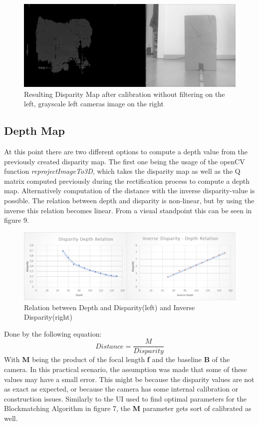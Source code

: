 \documentclass[journal,onecolumn]{IEEEtran}
\begin{document}
\begin{figure}[H]
	\centering
	\includegraphics[scale=0.5]{disparityMap.png}
	\captionsetup{justification=centering}
	\caption{Resulting Disparity Map after calibration without filtering on the left, grayscale left cameras image on the right}
\end{figure}

\subsection{Depth Map}
\noindent
\noindent At this point there are two different options to compute a depth value from the previously created disparity map. The first one being the usage of the openCV function \emph{reprojectImageTo3D}, which takes the disparity map as well as the Q matrix computed  previously during the rectification process to compute a depth map.
Alternatively computation of the distance with the inverse disparity-value is possible. The relation between depth and disparity is non-linear, but by using the inverse this relation becomes linear. From a visual standpoint this can be seen in figure 9.
\begin{figure}[H]
	\centering
	\includegraphics[scale=0.5]{ratios.png}
	\captionsetup{justification=centering}
	\caption{Relation between Depth and Disparity(left) and Inverse Disparity(right)}
\end{figure}
\noindent Done by the following equation:
\begin{equation}
	Distance = \frac{M}{Disparity}
\end{equation}
\noindent With {\bf M} being the product of the focal length {\bf f} and the baseline {\bf B} of the camera. \newline
In this practical scenario, the assumption was made that some of these values may have a small error. This might be because the disparity values are not as exact as expected, or because the camera has some internal calibration or construction issues. Similarly to the UI used to find optimal parameters for the Blockmatching Algorithm in figure 7, the {\bf M} parameter gets sort of calibrated as well.
\end{document}
